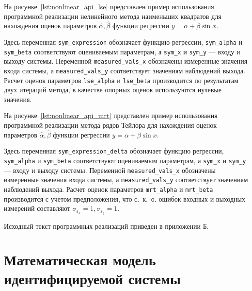 На рисунке~\ref{lst:nonlinear_api_lse} представлен пример использования
программной реализации нелинейного метода наименьших квадратов для
нахождения оценок параметров \( \hat{\alpha}, \hat{\beta} \)
функции регрессии \( y = \alpha + \beta \sin{x} \).


Здесь переменная \texttt{sym\_expression} обозначает функцию регрессии,
\texttt{sym\_alpha} и \texttt{sym\_beta} соответствуют оцениваемым параметрам,
а \texttt{sym\_x} и \texttt{sym\_y} --- входу и выходу системы.
Переменной \texttt{measured\_vals\_x} обозначены измеренные значения входа системы,
а \texttt{measured\_vals\_y} соответствует значениям наблюдений выхода.
Расчет оценок параметров \texttt{lse\_alpha} и \texttt{lse\_beta} производится по
результатам двух итераций метода, в качестве опорных оценок используются нулевые значения.

На рисунке~\ref{lst:nonlinear_api_mrt} представлен пример использования
программной реализации метода рядов Тейлора для
нахождения оценок параметров \( \hat{\alpha}, \hat{\beta} \)
функции регрессии \( y = \alpha + \beta \sin{x} \).


Здесь переменная \texttt{sym\_expression\_delta} обозначает функцию регрессии,
\texttt{sym\_alpha} и \texttt{sym\_beta} соответствуют оцениваемым параметрам,
а \texttt{sym\_x} и \texttt{sym\_y} --- входу и выходу системы.
Переменной \texttt{measured\_vals\_x} обозначены измеренные значения входа системы,
а \texttt{measured\_vals\_y} соответствует значениям наблюдений выхода.
Расчет оценок параметров \texttt{mrt\_alpha} и \texttt{mrt\_beta} производится
с учетом предположения, что с.~к.~о. ошибок входных и выходных измерений составляют
\( \sigma_{\varepsilon_x } = 1, \sigma_{\varepsilon_y } = 1 \).

Исходный текст программных реализаций приведен в приложении Б.


\section{Математическая модель идентифицируемой системы}

